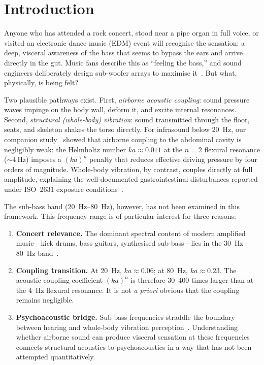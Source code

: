\section{Introduction}
\label{sec:introduction}

Anyone who has attended a rock concert, stood near a pipe organ in full
voice, or visited an electronic dance music (EDM) event will recognise
the sensation: a deep, visceral awareness of the bass that seems to
bypass the ears and arrive directly in the gut.  Music fans describe
this as ``feeling the bass,'' and sound engineers deliberately design
sub-woofer arrays to maximise it~\cite{Leventhall2007, Moller2004}.
But what, physically, is being felt?

Two plausible pathways exist.  First, \emph{airborne acoustic coupling}:
sound pressure waves impinge on the body wall, deform it, and excite
internal resonances.  Second, \emph{structural (whole-body) vibration}:
sound transmitted through the floor, seats, and skeleton shakes the
torso directly.  For infrasound below \SI{20}{\hertz}, our companion
study~\cite{Mace2026browntone} showed that airborne coupling to the
abdominal cavity is negligibly weak: the Helmholtz number
$ka \approx 0.011$ at the $n = 2$ flexural resonance
(${\sim}\SI{4}{\hertz}$) imposes a $(ka)^n$ penalty that reduces
effective driving pressure by four orders of magnitude.  Whole-body
vibration, by contrast, couples directly at full amplitude, explaining
the well-documented gastrointestinal disturbances reported under ISO~2631
exposure conditions~\cite{iso2631, Griffin1990}.

The sub-bass band (\SIrange{20}{80}{\hertz}), however, has not been
examined in this framework.  This frequency range is of particular
interest for three reasons:
%
\begin{enumerate}
  \item \textbf{Concert relevance.}  The dominant spectral content of
    modern amplified music---kick drums, bass guitars, synthesised
    sub-bass---lies in the \SIrange{30}{80}{\hertz}
    band~\cite{Gunderson2016, Opperman2006}.

  \item \textbf{Coupling transition.}  At \SI{20}{\hertz},
    $ka \approx 0.06$; at \SI{80}{\hertz}, $ka \approx 0.23$.  The
    acoustic coupling coefficient $(ka)^n$ is therefore
    \numrange{30}{400} times larger than at the \SI{4}{\hertz} flexural
    resonance.  It is not \emph{a priori} obvious that the coupling
    remains negligible.

  \item \textbf{Psychoacoustic bridge.}  Sub-bass frequencies straddle
    the boundary between hearing and whole-body vibration
    perception~\cite{Todd2000, iso226}.  Understanding whether airborne
    sound can produce visceral sensation at these frequencies connects
    structural acoustics to psychoacoustics in a way that has not been
    attempted quantitatively.
\end{enumerate}

